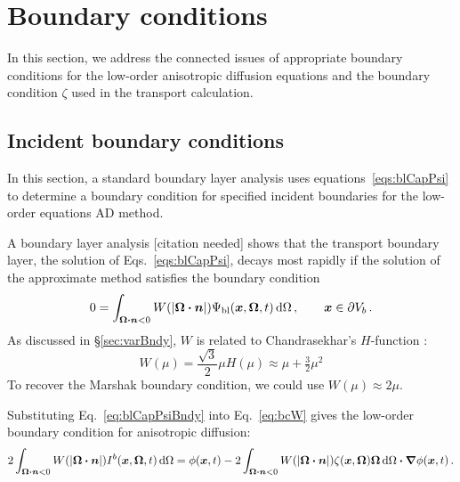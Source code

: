 \section{Boundary conditions}\label{sec:derBc}

In this section, we address the connected issues of appropriate boundary
conditions for the low-order anisotropic diffusion equations and the boundary
condition $\zeta$ used in the transport calculation.

\subsection{Incident boundary conditions}
In this section, a standard boundary layer analysis uses
equations~\eqref{eqs:blCapPsi} to determine a boundary condition for specified
incident boundaries for the low-order equations AD method.

A boundary layer analysis 
{\small [citation needed]}
shows that the transport boundary layer, the solution of
Eqs.~\eqref{eqs:blCapPsi}, decays most rapidly if the solution of the
approximate method satisfies the boundary condition
\begin{equation} \label{eq:bcW}
  0 = \int_{\bm{\Omega} \bm{\cdot} \bm{n} < 0} W(\left| \bm{\Omega} \bm{\cdot} \bm{n} \right|)
  \Psi_\mathrm{bl} (\bm{x}, \bm{\Omega}, t) \mathop{}\!\mathrm{d} \Omega\,,\qquad \bm{x} \in
  \partial V_b\,.
\end{equation}
As discussed in \S\ref{sec:varBndy}, $W$ is related to Chandrasekhar's
$H$-function \cite{Cha1960}:
\begin{equation} \label{eq:chandraW}
  W(\mu) = \frac{\sqrt{3}}{2} \mu H(\mu)
  \approx \mu + \tfrac{3}{2} \mu^2
\end{equation}
To recover the Marshak boundary condition, we could use $W(\mu) \approx 2 \mu$.

Substituting Eq.~\eqref{eq:blCapPsiBndy} into Eq.~\eqref{eq:bcW} gives the
low-order boundary condition for anisotropic diffusion:
\begin{equation} \label{eq:bcInc1}
  2\int_{\bm{\Omega}\bm{\cdot} \bm{n} < 0}
  W(\left| \bm{\Omega} \bm{\cdot} \bm{n} \right|) I^b(\bm{x}, \bm{\Omega}, t) \mathop{}\!\mathrm{d}\Omega
  = \phi(\bm{x}, t)
  - 2\int_{\bm{\Omega}\bm{\cdot} \bm{n} < 0} W(\left| \bm{\Omega} \bm{\cdot} \bm{n} \right|)
  \zeta(\bm{x}, \bm{\Omega}) \bm{\Omega} \mathop{}\!\mathrm{d}\Omega
  \bm{\cdot} \bm{\nabla} \phi(\bm{x}, t) \,.
\end{equation}

